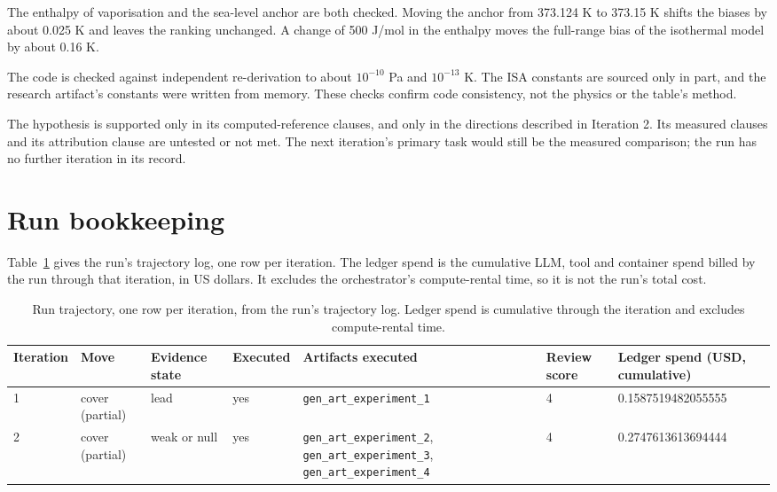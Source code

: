 \documentclass[11pt,letterpaper]{article}
\begin{document}
The enthalpy of vaporisation and the sea-level anchor are both checked. Moving the anchor from 373.124 K to 373.15 K shifts the biases by about 0.025 K and leaves the ranking unchanged. A change of 500 J/mol in the enthalpy moves the full-range bias of the isothermal model by about 0.16 K.

The code is checked against independent re-derivation to about $10^{-10}$ Pa and $10^{-13}$ K. The ISA constants are sourced only in part, and the research artifact's constants were written from memory. These checks confirm code consistency, not the physics or the table's method.

The hypothesis is supported only in its computed-reference clauses, and only in the directions described in Iteration 2. Its measured clauses and its attribution clause are untested or not met. The next iteration's primary task would still be the measured comparison; the run has no further iteration in its record.

\section{Run bookkeeping}

Table~\ref{tab:book} gives the run's trajectory log, one row per iteration. The ledger spend is the cumulative LLM, tool and container spend billed by the run through that iteration, in US dollars. It excludes the orchestrator's compute-rental time, so it is not the run's total cost.

\begin{table}[!htbp]
\centering\footnotesize
\caption{Run trajectory, one row per iteration, from the run's trajectory log. Ledger spend is cumulative through the iteration and excludes compute-rental time.}\label{tab:book}
\begin{tabular}{p{1.4cm}p{2.2cm}p{2.0cm}p{1.6cm}p{4.2cm}p{1.4cm}p{2.0cm}}
\toprule
Iteration & Move & Evidence state & Executed & Artifacts executed & Review score & Ledger spend (USD, cumulative) \\
\midrule
1 & cover (partial) & lead & yes & \texttt{gen\_art\_experiment\_1} & 4 & 0.1587519482055555 \\
2 & cover (partial) & weak or null & yes & \texttt{gen\_art\_experiment\_2}, \texttt{gen\_art\_experiment\_3}, \texttt{gen\_art\_experiment\_4} & 4 & 0.2747613613694444 \\
\bottomrule
\end{tabular}
\end{table}
\end{document}
